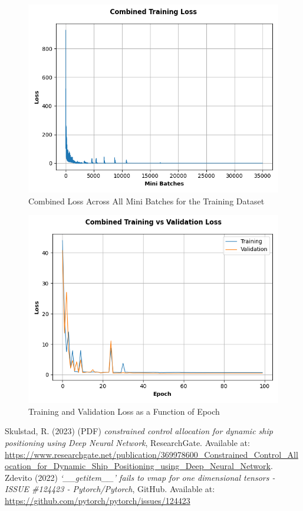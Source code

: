 \documentclass{article}
\begin{document}
\begin{figure}[H]
    \centering
    \includegraphics[scale=0.65]{../best_outputs/train_fig.png}
    \caption{Combined Loss Across All Mini Batches for the Training Dataset}
    \label{fig:train}
\end{figure}

\begin{figure}[H]
    \centering
    \includegraphics[scale=0.65]{../best_outputs/trval_fig.png}
    \caption{Training and Validation Loss as a Function of Epoch}
    \label{fig:trval}
\end{figure}

\begin{thebibliography}{99}
     Skulstad, R. (2023) (PDF) \textit{constrained control allocation for dynamic ship positioning using Deep Neural Network}, ResearchGate. Available at: \url{https://www.researchgate.net/publication/369978600\_Constrained\_Control\_Allocation\_for\_Dynamic\_Ship\_Positioning\_using\_Deep\_Neural\_Network}. 
     Zdevito (2022) \textit{`\_\_getitem\_\_' fails to vmap for one dimensional tensors - ISSUE \#124423 - Pytorch/Pytorch}, GitHub. Available at: \url{https://github.com/pytorch/pytorch/issues/124423}
\end{thebibliography}
\end{document}
